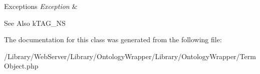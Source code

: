 \begin{DoxyExceptions}{Exceptions}
{\em Exception} & \\
\hline
\end{DoxyExceptions}
\begin{DoxySeeAlso}{See Also}
k\-T\-A\-G\-\_\-\-N\-S 
\end{DoxySeeAlso}


The documentation for this class was generated from the following file\-:\begin{DoxyCompactItemize}
\item 
/\-Library/\-Web\-Server/\-Library/\-Ontology\-Wrapper/\-Library/\-Ontology\-Wrapper/Term\-Object.\-php\end{DoxyCompactItemize}
